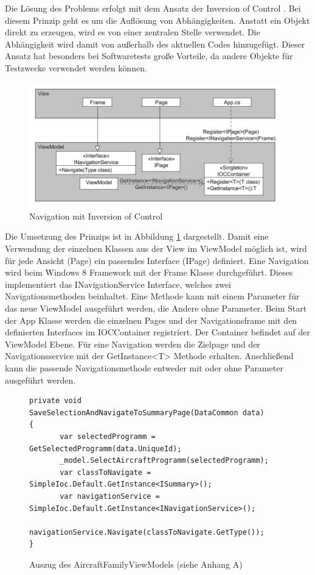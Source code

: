 Die Lösung des Problems erfolgt mit dem Ansatz der Inversion of Control \cite{bib:ioc}. Bei diesem Prinzip geht es um die Auflösung von Abhängigkeiten. Anstatt ein Objekt direkt zu erzeugen, wird es von einer zentralen Stelle verwendet. Die Abhängigkeit wird damit von außerhalb des aktuellen Codes hinzugefügt. Dieser Ansatz hat besonders bei Softwaretests große Vorteile, da andere Objekte für Testzwecke verwendet werden können.  \par
\begin{figure}[H]
\centering
\includegraphics[width=\hsize]{images/dependencyInjection}
\caption{Navigation mit Inversion of Control}
\label{ioc}
\end{figure}
Die Umsetzung des Prinzips ist in Abbildung \ref{ioc} dargestellt. Damit eine Verwendung der einzelnen Klassen aus der View im ViewModel möglich ist, wird für jede Ansicht (Page) ein passendes Interface (IPage) definiert. Eine Navigation wird beim Windows 8 Framework mit der Frame Klasse durchgeführt. Dieses implementiert das INavigationService Interface, welches zwei Navigationsmethoden beinhaltet. Eine Methode kann mit einem Parameter für das neue ViewModel ausgeführt werden, die Andere ohne Parameter. Beim Start der App Klasse werden die einzelnen Pages und der Navigationsframe mit den definierten Interfaces im IOCContainer registriert. Der Container befindet auf der ViewModel  Ebene. Für eine Navigation werden die Zielpage und der Navigationsservice mit der GetInstance<T> Methode erhalten. Anschließend kann die passende Navigationsmethode entweder mit oder ohne Parameter ausgeführt werden. \par 
\begin{figure}
\begin{lstlisting}
private void SaveSelectionAndNavigateToSummaryPage(DataCommon data)
{
       var selectedProgramm = GetSelectedProgramm(data.UniqueId);
       _model.SelectAircraftProgramm(selectedProgramm);
       var classToNavigate = SimpleIoc.Default.GetInstance<ISummary>();
       var navigationService = SimpleIoc.Default.GetInstance<INavigationService>();
       navigationService.Navigate(classToNavigate.GetType());
}
\end{lstlisting}
\caption{Auszug des AircraftFamilyViewModels (siehe Anhang A)}
\label{navigateMethod}
\end{figure}

